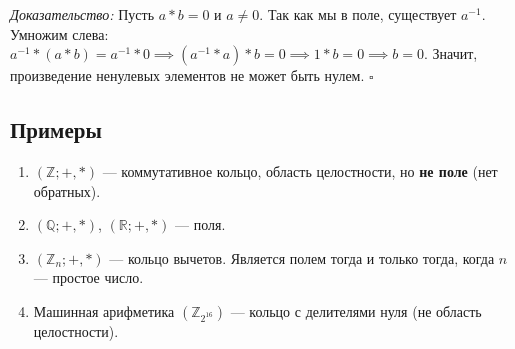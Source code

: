 \textit{Доказательство:}
Пусть $a \ast b = 0$ и $a \neq 0$. Так как мы в поле, существует $a^{-1}$. 
Умножим слева: $a^{-1} \ast (a \ast b) = a^{-1} \ast 0 \implies (a^{-1} \ast a) \ast b = 0 \implies 1 \ast b = 0 \implies b = 0$. 
Значит, произведение ненулевых элементов не может быть нулем. $\square$

\subsection*{Примеры}
\begin{enumerate}
    \item $(\mathbb{Z}; +, \ast)$ — коммутативное кольцо, область целостности, но \textbf{не поле} (нет обратных).
    \item $(\mathbb{Q}; +, \ast)$, $(\mathbb{R}; +, \ast)$ — поля.
    \item $(\mathbb{Z}_n; +, \ast)$ — кольцо вычетов. Является полем тогда и только тогда, когда $n$ — простое число.
    \item Машинная арифметика $(\mathbb{Z}_{2^{16}})$ — кольцо с делителями нуля (не область целостности).
\end{enumerate}